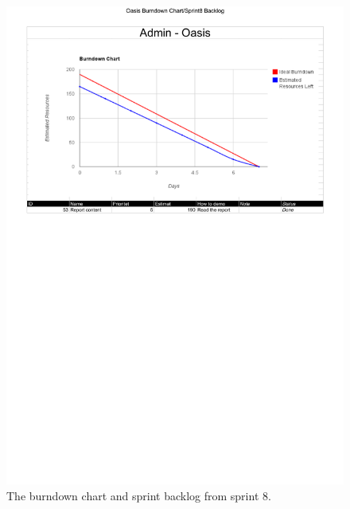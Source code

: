 \begin{figure}[htbp]
	\centering
		\includegraphics[width=\textwidth]{Images/sprint_backlogs/Oasis Burndown Chart - Sprint8 Backlog}
	\caption{The burndown chart and sprint backlog from sprint 8.}
	\label{fig:sprint8}
\end{figure}